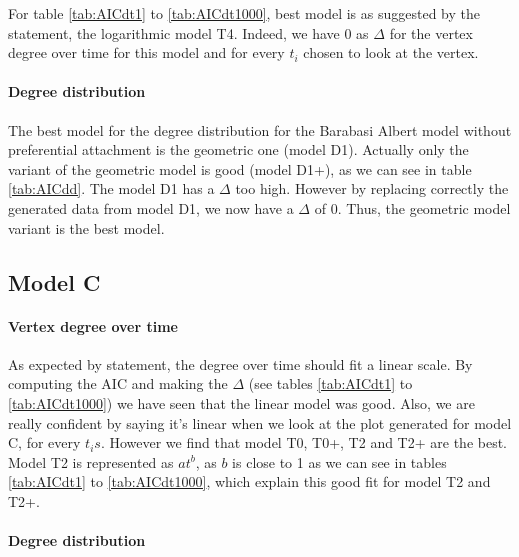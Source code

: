 \documentclass[a4paper]{article}
\begin{document}
For table \ref{tab:AICdt1} to \ref{tab:AICdt1000}, best model is as suggested by 
the statement, the logarithmic model T4. Indeed, we have 0 as $\Delta$ for the 
vertex degree over time for this model and for every $t_i$ chosen to look at the 
vertex.


\paragraph{Degree distribution}


The best model for the degree distribution for the Barabasi Albert model without
preferential attachment is the geometric one (model D1). Actually only the
variant of the geometric model is good (model D1+), as we can see in table
\ref{tab:AICdd}. The model D1 has a $\Delta$ too high. However by replacing
correctly the generated data from model D1, we now have a $\Delta$ of 0.
Thus, the geometric model variant is the best model.




\subsection{Model C}

\paragraph{Vertex degree over time}

As expected by statement, the degree over time should fit a linear scale. By 
computing the AIC and making the $\Delta$ (see tables \ref{tab:AICdt1} to 
\ref{tab:AICdt1000}) we have seen that the linear model was good. Also, we are 
really confident by saying it's linear when we look at the plot generated for 
model C, for every $t_is$. However we find that model T0, T0+, T2 and T2+ are 
the best. Model T2 is represented as $at^b$, as $b$ is close to 1 as we can see 
in tables \ref{tab:AICdt1} to \ref{tab:AICdt1000}, which explain this good fit 
for model T2 and T2+.

\paragraph{Degree distribution}
\end{document}

